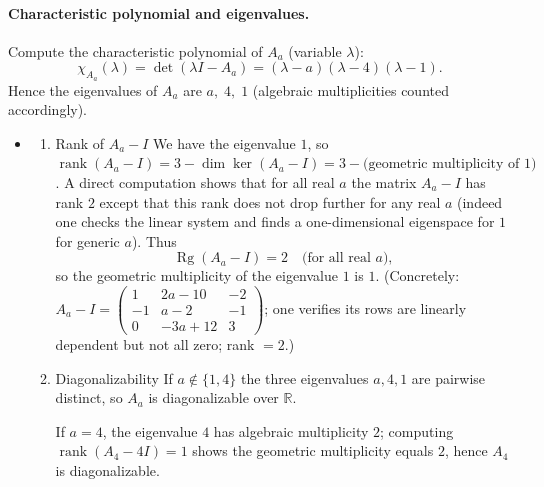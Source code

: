 \documentclass[12pt]{article}
\begin{document}
\begin{answerbox}
\paragraph{Characteristic polynomial and eigenvalues.}
Compute the characteristic polynomial of $A_a$ (variable $\lambda$):
\[\chi_{A_a}(\lambda)=\det(\lambda I - A_a)=(\lambda-a)(\lambda-4)(\lambda-1).\]
Hence the eigenvalues of $A_a$ are $a,\;4,\;1$ (algebraic multiplicities counted accordingly).

\begin{itemize}
    \item 
        \begin{enumerate}
            \item Rank of $A_a-I$
                We have the eigenvalue $1$, so $\operatorname{rank}(A_a-I)=3-\dim \ker(A_a-I)=3-\text{(geometric multiplicity of }1)$. A direct computation shows that for all real $a$ the matrix $A_a-I$ has rank $2$ except that this rank does not drop further for any real $a$ (indeed one checks the linear system and finds a one-dimensional eigenspace for $1$ for generic $a$). Thus
                \[\operatorname{Rg}(A_a-I)=2\quad\text{(for all real $a$)},\]
                so the geometric multiplicity of the eigenvalue $1$ is $1$.
                (Concretely: $A_a-I=\begin{pmatrix}1 & 2a-10 & -2\\ -1 & a-2 & -1\\ 0 & -3a+12 & 3\end{pmatrix}$; one verifies its rows are linearly dependent but not all zero; rank $=2$.)
            \item Diagonalizability
                If $a\notin\{1,4\}$ the three eigenvalues $a,4,1$ are pairwise distinct, so $A_a$ is diagonalizable over $\mathbb{R}$.
                
                
                If $a=4$, the eigenvalue $4$ has algebraic multiplicity $2$; computing $\operatorname{rank}(A_4-4I)=1$ shows the geometric multiplicity equals $2$, hence $A_4$ is diagonalizable.
                

\end{enumerate}
\end{itemize}
\end{answerbox}
\end{document}

